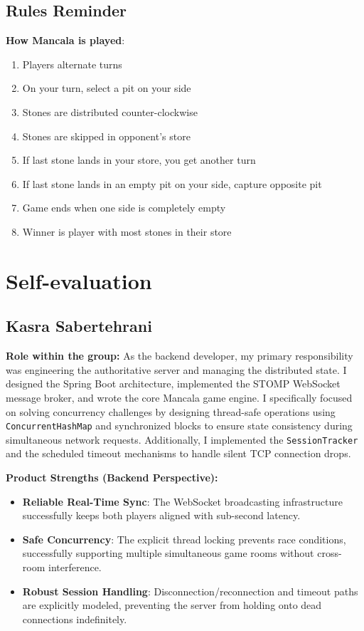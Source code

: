 \documentclass{scrartcl}
\begin{document}
\subsection{Rules Reminder}

\textbf{How Mancala is played}:

\begin{enumerate}
  \item Players alternate turns
  \item On your turn, select a pit on your side
  \item Stones are distributed counter-clockwise
  \item Stones are skipped in opponent's store
  \item If last stone lands in your store, you get another turn
  \item If last stone lands in an empty pit on your side, capture opposite pit
  \item Game ends when one side is completely empty
  \item Winner is player with most stones in their store
\end{enumerate}

\section{Self-evaluation}\label{self-evaluation}

\subsection{Kasra Sabertehrani}

\textbf{Role within the group:}
As the backend developer, my primary responsibility was engineering the authoritative server and managing the distributed state. I designed the Spring Boot architecture, implemented the STOMP WebSocket message broker, and wrote the core Mancala game engine. I specifically focused on solving concurrency challenges by designing thread-safe operations using \texttt{ConcurrentHashMap} and synchronized blocks to ensure state consistency during simultaneous network requests. Additionally, I implemented the \texttt{SessionTracker} and the scheduled timeout mechanisms to handle silent TCP connection drops.

\textbf{Product Strengths (Backend Perspective):}
\begin{itemize}
  \item \textbf{Reliable Real-Time Sync}: The WebSocket broadcasting infrastructure successfully keeps both players aligned with sub-second latency.
  \item \textbf{Safe Concurrency}: The explicit thread locking prevents race conditions, successfully supporting multiple simultaneous game rooms without cross-room interference.
  \item \textbf{Robust Session Handling}: Disconnection/reconnection and timeout paths are explicitly modeled, preventing the server from holding onto dead connections indefinitely.
\end{itemize}
\end{document}

